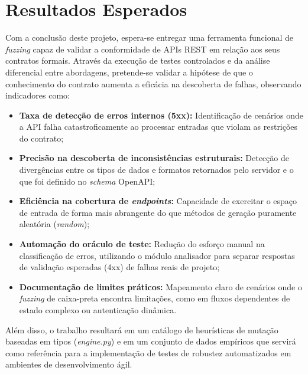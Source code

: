 \section{Resultados Esperados}\label{sec:resultados}

Com a conclusão deste projeto, espera-se entregar uma ferramenta funcional de \textit{fuzzing} capaz de validar a conformidade de APIs REST em relação aos seus contratos formais. Através da execução de testes controlados e da análise diferencial entre abordagens, pretende-se validar a hipótese de que o conhecimento do contrato aumenta a eficácia na descoberta de falhas, observando indicadores como:

\begin{itemize}
    \item \textbf{Taxa de detecção de erros internos (5xx):} Identificação de cenários onde a API falha catastroficamente ao processar entradas que violam as restrições do contrato;
    \item \textbf{Precisão na descoberta de inconsistências estruturais:} Detecção de divergências entre os tipos de dados e formatos retornados pelo servidor e o que foi definido no \textit{schema} OpenAPI;
    \item \textbf{Eficiência na cobertura de \textit{endpoints}:} Capacidade de exercitar o espaço de entrada de forma mais abrangente do que métodos de geração puramente aleatória (\textit{random});
    \item \textbf{Automação do oráculo de teste:} Redução do esforço manual na classificação de erros, utilizando o módulo analisador para separar respostas de validação esperadas (4xx) de falhas reais de projeto;
    \item \textbf{Documentação de limites práticos:} Mapeamento claro de cenários onde o \textit{fuzzing} de caixa-preta encontra limitações, como em fluxos dependentes de estado complexo ou autenticação dinâmica.
\end{itemize}

Além disso, o trabalho resultará em um catálogo de heurísticas de mutação baseadas em tipos (\textit{engine.py}) e em um conjunto de dados empíricos que servirá como referência para a implementação de testes de robustez automatizados em ambientes de desenvolvimento ágil.
